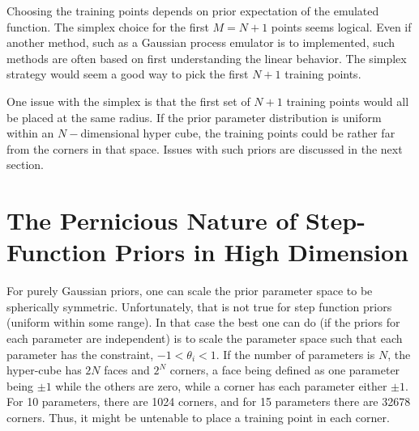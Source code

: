 \documentclass[12pt]{article}
\numberwithin{equation}{section}
\numberwithin{figure}{section}
\begin{document}
Choosing the training points depends on prior expectation of the emulated function. The simplex choice for the first $M=N+1$ points seems logical. Even if another method, such as a Gaussian process emulator is to implemented, such methods are often based on first understanding the linear behavior. The simplex strategy would seem a good way to pick the first $N+1$ training points.

One issue with the simplex is that the first set of $N+1$ training points would all be placed at the same radius. If the prior parameter distribution is uniform within an $N-$dimensional hyper cube, the training  points could be rather far from the corners in that space. Issues with such priors are discussed in the next section.

\section{The Pernicious Nature of Step-Function Priors in High Dimension}

For purely Gaussian priors, one can scale the prior parameter space to be spherically symmetric. Unfortunately, that is not true for step function priors (uniform within some range). In that case the best one can do (if the priors for each parameter are independent) is to scale the parameter space such that each parameter has the constraint, $-1<\theta_i<1$. If the number of parameters is $N$, the hyper-cube has $2N$ faces and $2^N$ corners, a face being defined as one parameter being $\pm 1$ while the others are zero, while a corner has each parameter either $\pm 1$. For 10 parameters, there are 1024 corners, and for 15 parameters there are 32678 corners. Thus, it might be untenable to place a training point in each corner. 
\end{document}
